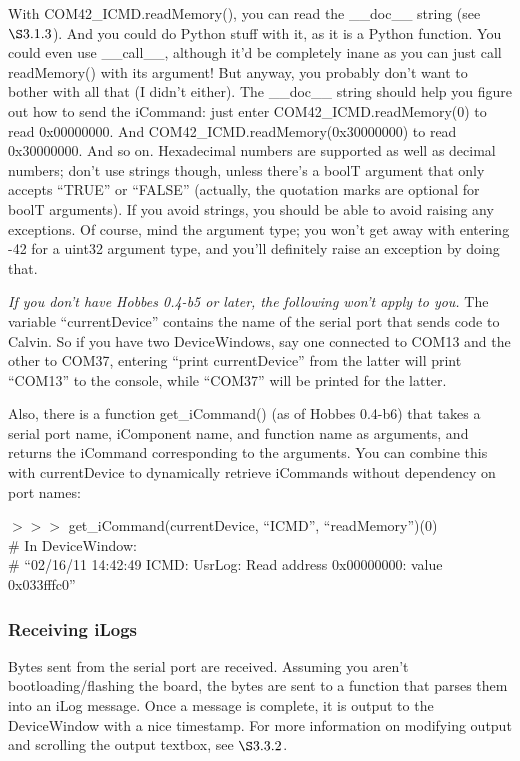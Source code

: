 With COM42\_ICMD.readMemory(), you can read the \_\_doc\_\_ string (see \hyperref[3.1.3]{$\S3.1.3$}). And you could do Python stuff with it, as it is a Python function. You could even use \_\_call\_\_, although it'd be completely inane as you can just call readMemory() with its argument! But anyway, you probably don't want to bother with all that (I didn't either). The \_\_doc\_\_ string should help you figure out how to send the iCommand: just enter COM42\_ICMD.readMemory(0) to read 0x00000000. And COM42\_ICMD.readMemory(0x30000000) to read 0x30000000. And so on. Hexadecimal numbers are supported as well as decimal numbers; don't use strings though, unless there's a boolT argument that only accepts ``TRUE'' or ``FALSE'' (actually, the quotation marks are optional for boolT arguments). If you avoid strings, you should be able to avoid raising any exceptions. Of course, mind the argument type; you won't get away with entering -42 for a uint32 argument type, and you'll definitely raise an exception by doing that.

\emph{If you don't have Hobbes 0.4-b5 or later, the following won't apply to you.}
The variable ``currentDevice'' contains the name of the serial port that sends code to Calvin. So if you have two DeviceWindows, say one connected to COM13 and the other to COM37, entering ``print currentDevice'' from the latter will print ``COM13'' to the console, while ``COM37'' will be printed for the latter.

Also, there is a function get\_iCommand() (as of Hobbes 0.4-b6) that takes a serial port name, iComponent name, and function name as arguments, and returns the iCommand corresponding to the arguments. You can combine this with currentDevice to dynamically retrieve iCommands without dependency on port names:

\vspace{12pt}
\noindent $>>>$ get\_iCommand(currentDevice, ``ICMD'', ``readMemory'')(0) \\ \# In DeviceWindow: \\ \# ``02/16/11 14:42:49 ICMD: UsrLog: Read address 0x00000000: value 0x033fffc0''


%
%
\subsubsection{Receiving iLogs}
\label{3.2.5}

Bytes sent from the serial port are received. Assuming you aren't bootloading/flashing the board, the bytes are sent to a function that parses them into an iLog message. Once a message is complete, it is output to the DeviceWindow with a nice timestamp. For more information on modifying output and scrolling the output textbox, see \hyperref[3.3.2]{$\S3.3.2$}.


